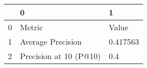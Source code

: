\begin{tabular}{lll}
\toprule
{} &                       0 &         1 \\
\midrule
0 &                  Metric &     Value \\
1 &       Average Precision &  0.417563 \\
2 &  Precision at 10 (P@10) &       0.4 \\
\bottomrule
\end{tabular}
